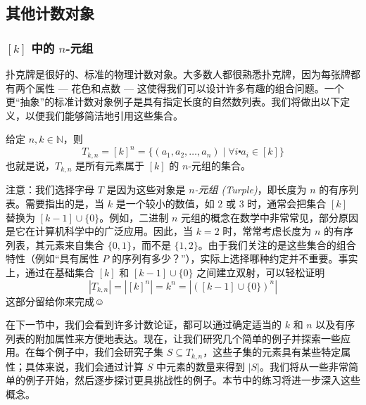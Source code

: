 
\subsection{其他计数对象}

\subsubsection*{$[k]$ 中的 $n$-元组}

扑克牌是很好的、标准的物理计数对象。大多数人都很熟悉扑克牌，因为每张牌都有两个属性 --- 花色和点数 --- 这使得我们可以设计许多有趣的组合问题。一个更``抽象''的标准计数对象例子是具有指定长度的自然数列表。我们将做出以下定义，以便我们能够简洁地引用这些集合。

\begin{definition}
    给定 $n,k \in \mathbb{N}$，则
    \[T_{k,n} = [k]^n = \{(a_1, a_2, \dots , a_n) \mid \forall i \centerdot a_i \in [k]\}\]
    也就是说，$T_{k,n}$ 是所有元素属于 $[k]$ 的 $n$-元组的集合。
\end{definition}

注意：我们选择字母 $T$ 是因为这些对象是 \emph{$n$-元组 (Turple)}，即长度为 $n$ 的有序列表。需要指出的是，当 $k$ 是一个较小的数值，如 $2$ 或 $3$ 时，通常会把集合 $[k]$ 替换为 $[k - 1] \cup \{0\}$。例如，二进制 $n$ 元组的概念在数学中非常常见，部分原因是它在计算机科学中的广泛应用。因此，当 $k = 2$ 时，常常考虑长度为 $n$ 的有序列表，其元素来自集合 $\{0, 1\}$，而不是 $\{1, 2\}$。由于我们关注的是这些集合的组合特性（例如``具有属性 $P$ 的序列有多少？''），实际上选择哪种约定并不重要。事实上，通过在基础集合 $[k]$ 和 $[k - 1] \cup \{0\}$ 之间建立双射，可以轻松证明
\[|T_{k,n}| = |[k]^n| = k^n = |([k - 1] \cup \{0\})^n|\]
这部分留给你来完成$\smiley{}$

在下一节中，我们会看到许多计数论证，都可以通过确定适当的 $k$ 和 $n$ 以及有序列表的附加属性来方便地表达。现在，让我们研究几个简单的例子并探索一些应用。在每个例子中，我们会研究子集 $S \subseteq T_{k,n}$，这些子集的元素具有某些特定属性；具体来说，我们会通过计算 $S$ 中元素的数量来得到 $|S|$。我们将从一些非常简单的例子开始，然后逐步探讨更具挑战性的例子。本节中的练习将进一步深入这些概念。


